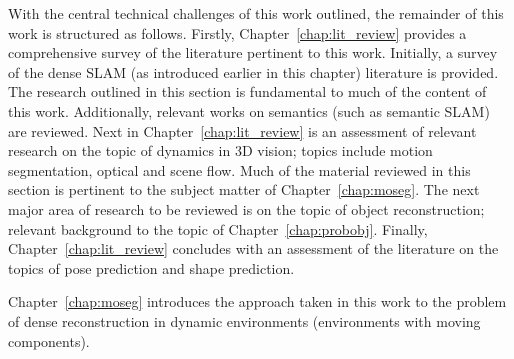 With the central technical challenges of this work outlined, the remainder of this work is structured 
as follows. Firstly, Chapter~\ref{chap:lit_review} provides a comprehensive survey of the literature 
pertinent to this work. Initially, a survey of the dense SLAM (as introduced earlier in this chapter) 
literature is provided. The research outlined in this section is fundamental to much of the content of 
this work. Additionally, relevant works on semantics (such as semantic SLAM) are reviewed. 
Next in Chapter~\ref{chap:lit_review} is an assessment of relevant research on the topic of dynamics in 
3D vision; topics include motion segmentation, optical and scene flow. Much of the material reviewed in 
this section is pertinent to the subject matter of Chapter~\ref{chap:moseg}. The next major area of 
research to be reviewed is on the topic of object reconstruction; relevant background to the topic of 
Chapter~\ref{chap:probobj}. Finally, Chapter~\ref{chap:lit_review} concludes with an assessment of the 
literature on the topics of pose prediction and shape prediction.

Chapter~\ref{chap:moseg} introduces the approach taken in this work to the problem of dense reconstruction 
in dynamic environments (environments with moving components).


